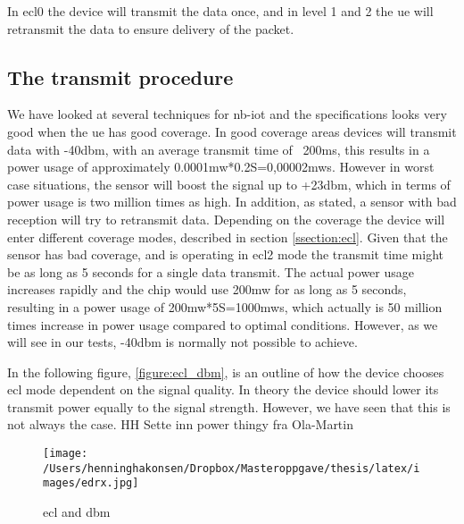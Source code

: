 \documentclass[USenglish]{ifimaster}  %
\begin{document}
In \acrshort{ecl}0 the device will transmit the data once, and in level 1 and 2 the \acrshort{ue} will retransmit the data to ensure delivery of the packet.

\subsection{The transmit procedure}
We have looked at several techniques for \acrshort{nb-iot} and the specifications looks very good when the \acrshort{ue} has good coverage. In good coverage areas devices will transmit data with -40\acrshort{dbm}, with an average transmit time of ~200ms, this results in a power usage of approximately 0.0001\acrshort{mw}*0.2S=0,00002\acrshort{mws}. However in worst case situations, the sensor will boost the signal up to +23\acrshort{dbm}, which in terms of power usage is two million times as high. In addition, as stated, a sensor with bad reception will try to retransmit data. Depending on the coverage the device will enter different coverage modes, described in section \vref{ssection:ecl}. Given that the sensor has bad coverage, and is operating in \acrshort{ecl}2 mode the transmit time might be as long as 5 seconds for a single data transmit. The actual power usage increases rapidly and the chip would use 200\acrshort{mw} for as long as 5 seconds, resulting in a power usage of 200\acrshort{mw}*5S=1000\acrshort{mws}, which actually is 50 million times increase in power usage compared to optimal conditions. However, as we will see in our tests, -40\acrshort{dbm} is normally not possible to achieve.

In the following figure, \vref{figure:ecl_dbm}, is an outline of how the device chooses \acrshort{ecl} mode dependent on the signal quality. In theory the device should lower its transmit power equally to the signal strength. However, we have seen that this is not always the case. HH Sette inn power thingy fra Ola-Martin


\begin{figure}[ht]
  \centering\texttt{[image: /Users/henninghakonsen/Dropbox/Masteroppgave/thesis/latex/images/edrx.jpg]}
  \caption{\acrshort{ecl} and \acrshort{dbm}}
  \label{figure:ecl_dbm}
\end{figure}
\end{document}
